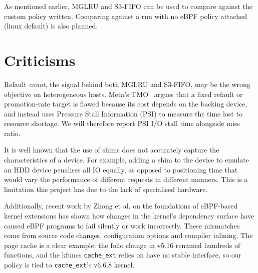 \documentclass[11pt,sigconf,nonacm]{acmart}
\begin{document}
As mentioned earlier, MGLRU\cite{multigenlru} and S3-FIFO\cite{s3fifo} can be used to compare against the custom policy written. Comparing against a run with no eBPF policy attached (linux default) is also planned. 



\section{Criticisms}



Refault \emph{count}, the signal behind both MGLRU and S3-FIFO, may be the wrong objective on heterogeneous hosts. Meta's TMO~\cite{tmo} argues that a fixed refault or promotion-rate target is flawed because its cost depends on the backing device, and instead uses Pressure Stall Information (PSI) to measure the time lost to resource shortage. We will therefore report PSI I/O stall time alongside miss ratio.


It is well known that the use of shims does not accurately capture the characteristics of a device. For example, adding a shim to the device to emulate an HDD device penalises all IO equally, as opposed to positioning time that would vary the performance of different requests in different manners. This is a limitation this project has due to the lack of specialised hardware.

Additionally, recent work by Zhong et al. \cite{depsurf} on the foundations of eBPF-based kernel extensions has shown how changes in the kernel’s dependency surface have caused eBPF programs to fail silently or work incorrectly. These mismatches come from source code changes, configuration options and compiler inlining. The page cache is a clear example: the folio change in v5.16 renamed hundreds of functions, and the kfuncs \texttt{cache\_ext} relies on have no stable interface, so our policy is tied to \texttt{cache\_ext}’s v6.6.8 kernel.
\end{document}
